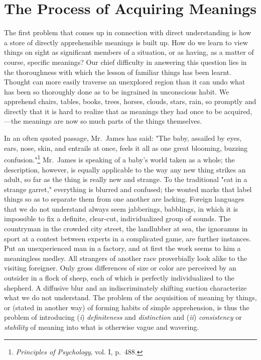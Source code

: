 \documentclass[showtrims,ustradepaper]{memoir}
\begin{document}
\section{The Process of Acquiring Meanings}


The first problem that comes up in connection with direct understanding
is how a store of directly
apprehensible
meanings is built up. How do we learn to view things on sight as
significant members of a situation, or as having, as a matter of course,
specific meanings? Our chief difficulty in answering this question lies
in the thoroughness with which the lesson of familiar things has been
learnt. Thought can more easily traverse an unexplored region than it
can undo what has been so thoroughly done as to be ingrained in
unconscious habit. We apprehend chairs, tables, books, trees, horses,
clouds, stars, rain, so promptly and directly that it is hard to realize
that as meanings they had once to be acquired,---the meanings are now so
much parts of the things themselves.


In an often quoted passage, Mr.\ James has said: "The baby, assailed by
eyes, ears, nose, skin, and entrails at once, feels it all as one great
blooming, buzzing
confusion."\footnote{
\emph{Principles of Psychology}, vol. I, p.\ 488.
}
Mr.\ James is speaking of a baby's world taken as a whole; the
description, however, is equally applicable to the way any new thing
strikes an adult, so far as the thing is really new and strange. To the
traditional "cat in a strange garret," everything is blurred and
confused; the wonted marks that label things so as to separate them from
one another are lacking. Foreign languages that we do not understand
always seem jabberings, babblings, in which it is impossible to fix a
definite, clear-cut, individualized group of sounds. The countryman in
the crowded city street, the landlubber at sea, the ignoramus in sport
at a contest between experts in a complicated game, are further
instances. Put an unexperienced man in a factory, and at first the work
seems to him a meaningless medley. All strangers of another race
proverbially look alike to the
visiting
foreigner. Only gross differences of size or color are perceived by an
outsider in a flock of sheep, each of which is perfectly individualized
to the shepherd. A diffusive blur and an indiscriminately shifting
suction characterize what we do not understand. The problem of the
acquisition of meaning by things, or (stated in another way) of forming
habits of simple apprehension, is thus the problem of introducing
(\emph{i}) \emph{definiteness} and \emph{distinction} and (\emph{ii})
\emph{consistency} or \emph{stability} of meaning into what is otherwise
vague and wavering.
\end{document}

